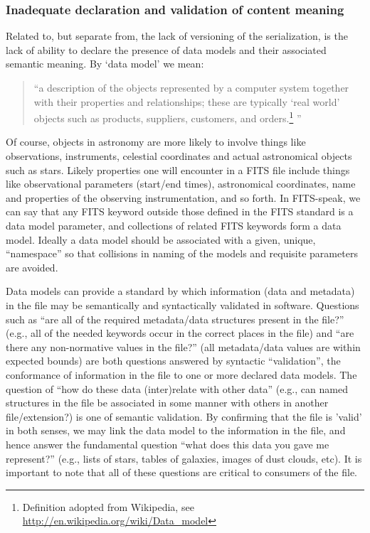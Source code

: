 \documentclass[final,authoryear,5p,times,twocolumn]{elsarticle}
\begin{document}
{{\subsubsection{Inadequate declaration and validation of content meaning}


Related to, but separate from, the lack of versioning of the
serialization, is the lack of ability to declare the presence of data
models and their associated semantic meaning.  By `data model' we
mean:


\begin{quote}
``a description of the objects represented by a computer system
together with their properties and relationships; these are typically
`real world' objects such as products, suppliers, customers, and
orders.\footnote{Definition adopted from Wikipedia, see \url{http://en.wikipedia.org/wiki/Data\_model}}
''
\end{quote}


Of course, objects in astronomy are more likely to involve things like
observations, instruments, celestial coordinates and actual astronomical
objects such as stars. Likely properties one will encounter in a FITS
file include things like observational parameters (start/end times),
astronomical coordinates, name and properties of the observing
instrumentation, and so forth. In FITS-speak, we can say that any FITS
keyword outside those defined in the FITS standard is a data model
parameter, and collections of related FITS keywords form a data model.
Ideally a data model should be associated with a given, unique,
``namespace'' so that collisions in naming of the models and requisite
parameters are avoided.


Data models can provide a standard by which information (data and metadata)
in the file may be semantically and syntactically validated in software.
Questions such as ``are all of the required metadata/data structures present
in the file?'' (e.g., all of
the needed keywords occur in the correct places in the file) and ``are
there any non-normative values in the file?'' (all metadata/data values
are within expected bounds) are both questions answered by syntactic
``validation'', the conformance of information in the file to one or more
declared data models.  The question of ``how do these data (inter)relate
with other data'' (e.g., can named structures in the file be associated
in some manner with others in another file/extension?) is one of semantic
validation. By confirming that the file is 'valid' in both senses, we may
link the data model to the information in the file, and hence answer the
fundamental question ``what does this data you gave me represent?'' (e.g., lists
of stars, tables of galaxies, images of dust clouds, etc).
It is important to note that all of these questions are critical to
consumers of the file.


}}
\end{document}
